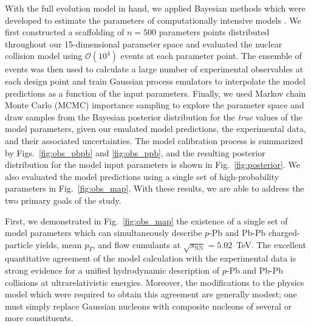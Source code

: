 \documentclass[aps,prc,reprint,amsmath,nofootinbib]{revtex4-1}
\newcommand{\sqrts}{\sqrt{s_\mathrm{NN}}}
\newcommand{\order}[1]{$\mathcal O(10^{#1})$}
\begin{document}
With the full evolution model in hand, we applied Bayesian methods which were developed to estimate the parameters of computationally intensive models \cite{OHagan:2006ba, Higdon:2008cmc, Higdon:2014tva}.
We first constructed a scaffolding of $n=500$ parameters points distributed throughout our 15-dimensional parameter space and evaluated the nuclear collision model using \order{4} events at each parameter point.
The ensemble of events was then used to calculate a large number of experimental observables at each design point and train Gaussian process emulators to interpolate the model predictions as a function of the input parameters.
Finally, we used Markov chain Monte Carlo (MCMC) importance sampling to explore the parameter space and draw samples from the Bayesian posterior distribution for the \emph{true} values of the model parameters, given our emulated model predictions, the experimental data, and their associated uncertainties.
The model calibration process is summarized by Figs.~\ref{fig:obs_pbpb} and \ref{fig:obs_ppb}, and the resulting posterior distribution for the model input parameters is shown in Fig.~\ref{fig:posterior}.
We also evaluated the model predictions using a single set of high-probability parameters in Fig.~\ref{fig:obs_map}.
With these results, we are able to address the two primary goals of the study.

First, we demonstrated in Fig.~\ref{fig:obs_map} the existence of a single set of model parameters which can simultaneously describe $p$-Pb and Pb-Pb charged-particle yields, mean $p_T$, and flow cumulants at $\sqrts=5.02$~TeV.
The excellent quantitative agreement of the model calculation with the experimental data is strong evidence for a unified hydrodynamic description of $p$-Pb and Pb-Pb collisions at ultrarelativistic energies.
Moreover, the modifications to the physics model which were required to obtain this agreement are generally modest; one must simply replace Gaussian nucleons with composite nucleons of several or more constituents.
\end{document}
